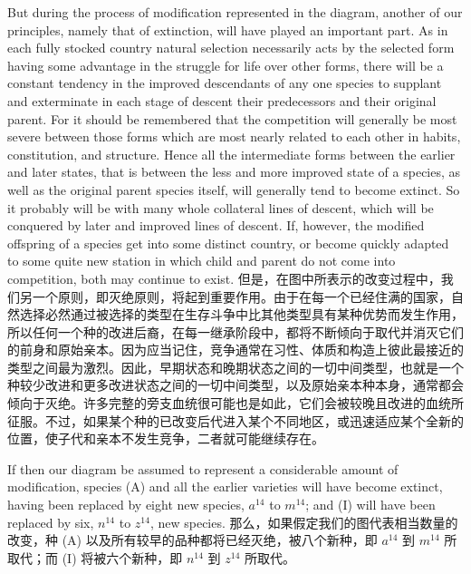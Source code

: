 \darwinpair
{But during the process of modification represented in the diagram, another of our principles, namely that of extinction, will have played an important part. As in each fully stocked country natural selection necessarily acts by the selected form having some advantage in the struggle for life over other forms, there will be a constant tendency in the improved descendants of any one species to supplant and exterminate in each stage of descent their predecessors and their original parent. For it should be remembered that the competition will generally be most severe between those forms which are most nearly related to each other in habits, constitution, and structure. Hence all the intermediate forms between the earlier and later states, that is between the less and more improved state of a species, as well as the original parent species itself, will generally tend to become extinct. So it probably will be with many whole collateral lines of descent, which will be conquered by later and improved lines of descent. If, however, the modified offspring of a species get into some distinct country, or become quickly adapted to some quite new station in which child and parent do not come into competition, both may continue to exist.}
{但是，在图中所表示的改变过程中，我们另一个原则，即灭绝原则，将起到重要作用。由于在每一个已经住满的国家，自然选择必然通过被选择的类型在生存斗争中比其他类型具有某种优势而发生作用，所以任何一个种的改进后裔，在每一继承阶段中，都将不断倾向于取代并消灭它们的前身和原始亲本。因为应当记住，竞争通常在习性、体质和构造上彼此最接近的类型之间最为激烈。因此，早期状态和晚期状态之间的一切中间类型，也就是一个种较少改进和更多改进状态之间的一切中间类型，以及原始亲本种本身，通常都会倾向于灭绝。许多完整的旁支血统很可能也是如此，它们会被较晚且改进的血统所征服。不过，如果某个种的已改变后代进入某个不同地区，或迅速适应某个全新的位置，使子代和亲本不发生竞争，二者就可能继续存在。}

\darwinpair
{If then our diagram be assumed to represent a considerable amount of modification, species (A) and all the earlier varieties will have become extinct, having been replaced by eight new species, $a^{14}$ to $m^{14}$; and (I) will have been replaced by six, $n^{14}$ to $z^{14}$, new species.}
{那么，如果假定我们的图代表相当数量的改变，种 (A) 以及所有较早的品种都将已经灭绝，被八个新种，即 $a^{14}$ 到 $m^{14}$ 所取代；而 (I) 将被六个新种，即 $n^{14}$ 到 $z^{14}$ 所取代。}

